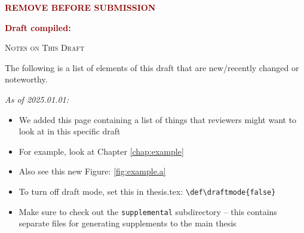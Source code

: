 {\bfseries \textcolor{darkred}{\selectfont \Huge REMOVE BEFORE SUBMISSION}}

\vspace{5mm}

{\bfseries \textcolor{darkred}{\selectfont \huge Draft compiled: \DTMnow}}

\vspace{10mm}


{\LARGE\textsc{Notes on This Draft}}

\vspace{10mm}

The following is a list of elements of this draft that are new/recently changed or noteworthy.


\textit{As of 2025.01.01:}
\begin{itemize}[topsep=0pt, itemsep=8pt]
	\item We added this page containing a list of things that reviewers might want to look at in this specific draft
	\item For example, look at Chapter \ref{chap:example}
	\item Also see this new Figure: \ref{fig:example.a}
	\item To turn off draft mode, set this in thesis.tex: \texttt{{\textbackslash}def{\textbackslash}draftmode\{false\}}
	\item Make sure to check out the \texttt{supplemental} subdirectory -- this contains separate files for generating supplements to the main thesis
\end{itemize}


